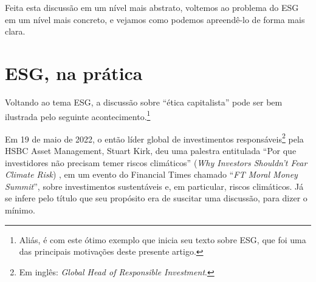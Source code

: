 \documentclass[12pt]{article}
\numberwithin{equation}{section}
\theoremstyle{plain}
\theoremstyle{definition}
\theoremstyle{remark}
\begin{document}
Feita esta discussão em um nível mais abstrato, voltemos ao problema do ESG em um nível mais concreto, e vejamos como podemos apreendê-lo de forma mais clara.

\section{ESG, na prática}
Voltando ao tema ESG, a discussão sobre ``ética capitalista'' pode ser bem ilustrada pelo seguinte acontecimento.\footnote{Aliás, é com este ótimo exemplo que \textcite{Telesforo2025} inicia seu texto sobre ESG, que foi uma das principais motivações deste presente artigo.}

Em 19 de maio de 2022, o então líder global de investimentos responsáveis\footnote{Em inglês: \textit{Global Head of Responsible Investment}.} pela HSBC Asset Management, Stuart Kirk, deu uma palestra entitulada ``Por que investidores não precisam temer riscos climáticos'' (\textit{Why Investors Shouldn't Fear Climate Risk}) \parencite{Kirk2022}, em um evento do Financial Times chamado ``\textit{FT Moral Money Summit}'', sobre investimentos sustentáveis e, em particular, riscos climáticos. Já se infere pelo título que seu propósito era de suscitar uma discussão, para dizer o mínimo.
\end{document}
